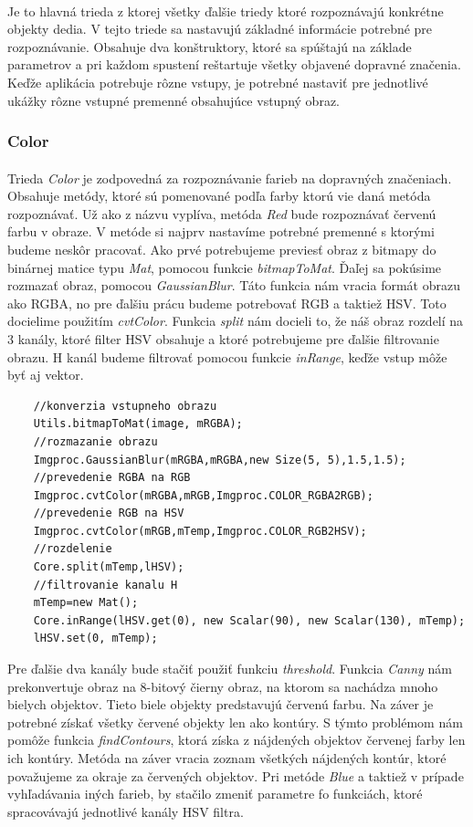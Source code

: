 \documentclass[12pt]{article}
\begin{document}
\paragraph{}
Je to hlavná trieda z ktorej všetky ďalšie triedy ktoré rozpoznávajú konkrétne objekty dedia.
V tejto triede sa nastavujú základné informácie potrebné pre rozpoznávanie.
Obsahuje dva konštruktory, ktoré sa spúštajú na základe parametrov a pri každom spustení reštartuje všetky objavené dopravné značenia.
Keďže aplikácia potrebuje rôzne vstupy, je potrebné nastaviť pre jednotlivé ukážky rôzne vstupné premenné obsahujúce vstupný obraz.
\subsubsection{Color}
\paragraph{}
Trieda \emph{Color} je zodpovedná za rozpoznávanie farieb na dopravných značeniach. Obsahuje metódy, ktoré sú pomenované podľa farby ktorú vie daná metóda rozpoznávať.
Už ako z názvu vyplíva, metóda \emph{Red} bude rozpoznávať červenú farbu v obraze. V metóde si najprv nastavíme potrebné premenné s ktorými budeme neskôr pracovať.
Ako prvé potrebujeme previesť obraz z bitmapy do binárnej matice typu \emph{Mat}, pomocou funkcie \emph{bitmapToMat}.
Ďaľej sa pokúsime rozmazať obraz, pomocou \emph{GaussianBlur}. Táto funkcia nám vracia formát obrazu ako RGBA, no pre ďalšiu prácu budeme potrebovať RGB a taktiež HSV.
Toto docielime použitím \emph{cvtColor}. Funkcia \emph{split} nám docieli to, že náš obraz rozdelí na 3 kanály, ktoré filter HSV obsahuje a ktoré potrebujeme pre ďalšie filtrovanie obrazu.
H kanál budeme filtrovať pomocou funkcie \emph{inRange}, keďže vstup môže byť aj vektor.
\begin{lstlisting}
	//konverzia vstupneho obrazu
	Utils.bitmapToMat(image, mRGBA);
	//rozmazanie obrazu
	Imgproc.GaussianBlur(mRGBA,mRGBA,new Size(5, 5),1.5,1.5);
	//prevedenie RGBA na RGB
	Imgproc.cvtColor(mRGBA,mRGB,Imgproc.COLOR_RGBA2RGB);
	//prevedenie RGB na HSV
	Imgproc.cvtColor(mRGB,mTemp,Imgproc.COLOR_RGB2HSV);
	//rozdelenie
	Core.split(mTemp,lHSV);
	//filtrovanie kanalu H
	mTemp=new Mat();
	Core.inRange(lHSV.get(0), new Scalar(90), new Scalar(130), mTemp);
	lHSV.set(0, mTemp);
\end{lstlisting}
Pre ďalšie dva kanály bude stačiť použiť funkciu \emph{threshold}.
Funkcia \emph{Canny} nám prekonvertuje obraz na 8-bitový čierny obraz, na ktorom sa nachádza mnoho bielych objektov. Tieto biele objekty predstavujú červenú farbu. 
Na záver je potrebné získať všetky červené objekty len ako kontúry. S týmto problémom nám pomôže funkcia \emph{findContours}, ktorá získa z nájdených objektov červenej farby len ich kontúry.
Metóda na záver vracia zoznam všetkých nájdených kontúr, ktoré považujeme za okraje za červených objektov.
Pri metóde \emph{Blue} a taktiež v prípade vyhľadávania iných farieb, by stačilo zmeniť parametre fo funkciách, ktoré spracovávajú jednotlivé kanály HSV filtra.
\end{document}
